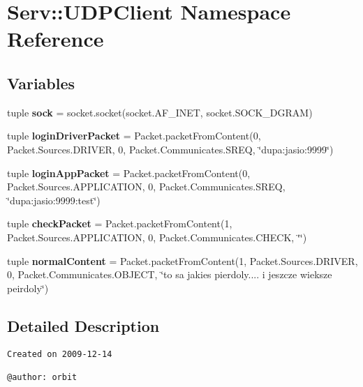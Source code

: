 \hypertarget{namespace_serv_1_1_u_d_p_client}{
\section{Serv::UDPClient Namespace Reference}
\label{namespace_serv_1_1_u_d_p_client}
}
\subsection*{Variables}
\begin{CompactItemize}
\item 
\hypertarget{namespace_serv_1_1_u_d_p_client_26010463e2557dd99ea69558ac84b513}{
tuple \textbf{sock} = socket.socket(socket.AF\_\-INET, socket.SOCK\_\-DGRAM)}
\label{namespace_serv_1_1_u_d_p_client_26010463e2557dd99ea69558ac84b513}

\item 
\hypertarget{namespace_serv_1_1_u_d_p_client_6a7c093d00705f1a7a45121724849c7a}{
tuple \textbf{loginDriverPacket} = Packet.packetFromContent(0, Packet.Sources.DRIVER, 0, Packet.Communicates.SREQ, \char`\"{}dupa:jasio:9999\char`\"{})}
\label{namespace_serv_1_1_u_d_p_client_6a7c093d00705f1a7a45121724849c7a}

\item 
\hypertarget{namespace_serv_1_1_u_d_p_client_8224433da892f0816d12f588d2c55cb5}{
tuple \textbf{loginAppPacket} = Packet.packetFromContent(0, Packet.Sources.APPLICATION, 0, Packet.Communicates.SREQ, \char`\"{}dupa:jasio:9999:test\char`\"{})}
\label{namespace_serv_1_1_u_d_p_client_8224433da892f0816d12f588d2c55cb5}

\item 
\hypertarget{namespace_serv_1_1_u_d_p_client_5ca5a80c0fb3b47ffa84794ed8d3352e}{
tuple \textbf{checkPacket} = Packet.packetFromContent(1, Packet.Sources.APPLICATION, 0, Packet.Communicates.CHECK, \char`\"{}\char`\"{})}
\label{namespace_serv_1_1_u_d_p_client_5ca5a80c0fb3b47ffa84794ed8d3352e}

\item 
\hypertarget{namespace_serv_1_1_u_d_p_client_f4d57687ceee96cbdac42b143b2dd99f}{
tuple \textbf{normalContent} = Packet.packetFromContent(1, Packet.Sources.DRIVER, 0, Packet.Communicates.OBJECT, \char`\"{}to sa jakies pierdoly.... i jeszcze wieksze peirdoly\char`\"{})}
\label{namespace_serv_1_1_u_d_p_client_f4d57687ceee96cbdac42b143b2dd99f}

\end{CompactItemize}


\subsection{Detailed Description}


\footnotesize\begin{verbatim}
Created on 2009-12-14

@author: orbit
\end{verbatim}
\normalsize
 


